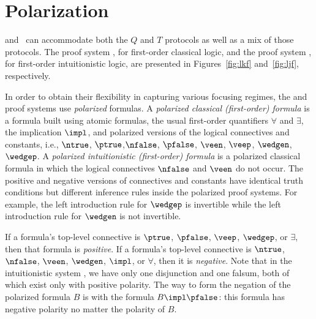 \documentclass{llncs}
\begin{document}
\section{Polarization}
\LKF and \LJF ~\cite{LiaMil09}can accommodate both the $Q$ and $T$ protocols as well
as a mix of those protocols.
%
The proof system \LKF, for first-order classical logic, and the
proof system \LJF, for first-order intuitionistic logic, are
presented in Figures~\ref{fig:lkf} and~\ref{fig:ljf}, respectively.

In order to obtain their flexibility in capturing various focusing
regimes, the \LKF and \LJF proof systems use \emph{polarized}
formulas.
%
A \emph{polarized classical (first-order) formula} is a formula built
using atomic formulas, 
the usual first-order quantifiers $\forall$ and $\exists$, the implication
$\impl$, and polarized versions of the logical connectives and
constants, i.e., $\ntrue$, $\ptrue$,$\nfalse$, $\pfalse$, $\veen$,
$\veep$, $\wedgen$, $\wedgep$.
%
A \emph{polarized intuitionistic (first-order) formula} is a polarized
classical formula in which the logical connectives $\nfalse$ and
$\veen$ do not occur.
%
The positive and negative versions of connectives and constants
have identical truth conditions but different inference rules
inside the polarized proof systems.
%
For example, the left introduction rule for $\wedgep$ is invertible
while the left introduction rule for $\wedgen$ is not invertible.


If a formula's top-level connective is $\ptrue$,
$\pfalse$, $\veep$, $\wedgep$, or $\exists$, then that formula is
\emph{positive}.
%
If a formula's top-level connective is $\ntrue$, $\nfalse$,
$\veen$, $\wedgen$, $\impl$, or $\forall$, then it is \emph{negative}.
%
Note that in the intuitionistic system \LJF, we have only one
disjunction and one falsum, both of which exist only with positive
polarity.
%
The way to form the negation of the polarized formula $B$ is with the
formula $B\impl\pfalse$: this formula has negative polarity no matter
the polarity of $B$.
\end{document}
